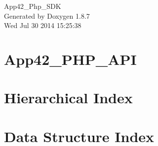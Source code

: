 \documentclass[twoside]{book}
\newcommand{\+}{\discretionary{\mbox{\scriptsize$\hookleftarrow$}}{}{}}
\newcommand{\clearemptydoublepage}{%
  \newpage{\pagestyle{empty}\cleardoublepage}%
}
\begin{document}
\hypersetup{pageanchor=false,
             bookmarks=true,
             bookmarksnumbered=true,
             pdfencoding=unicode
            }
\begin{titlepage}
\vspace*{7cm}
\begin{center}%
{\Large App42\+\_\+\+Php\+\_\+\+S\+D\+K }\\
\vspace*{1cm}
{\large Generated by Doxygen 1.8.7}\\
\vspace*{0.5cm}
{\small Wed Jul 30 2014 15:25:38}\\
\end{center}
\end{titlepage}
\clearemptydoublepage
\tableofcontents
\clearemptydoublepage
{}
\hypersetup{pageanchor=true}

\chapter{App42\+\_\+\+P\+H\+P\+\_\+\+A\+P\+I}
\label{md__e_1__samita_work_git_project__a_p_i__app42_php_api__r_e_a_d_m_e}
\hypertarget{md__e_1__samita_work_git_project__a_p_i__app42_php_api__r_e_a_d_m_e}{}

\chapter{Hierarchical Index}

\chapter{Data Structure Index}

\end{document}
